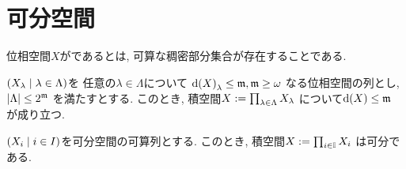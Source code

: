 \documentclass[uplatex, dvipdfmx, a4paper, 12pt, class=jsbook, crop=false]{standalone}
\begin{document}
\section{可分空間}
\label{sec:separable-spaces}

\begin{definition}
	位相空間$ X $がであるとは,
	可算な稠密部分集合が存在することである.
\end{definition}

\begin{theorem}
	\label{sep00001}
	\( \setfamily{X_\lambda}{\lambda \in \Lambda} \)を
	任意の\( \lambda \in \Lambda \)について
	\( \topdensity{X}_\lambda \leq \mathfrak{m}, \mathfrak{m} \geq \omega \)
	なる位相空間の列とし,
	\( \left|\Lambda\right| \leq 2^{\mathfrak{m}} \)
	を満たすとする.
	このとき, 積空間\( X \mathrel{:=} \prod_{\lambda \in \Lambda} X_\lambda \)
	について\( \topdensity{X} \leq \mathfrak{m} \)
	が成り立つ.
\end{theorem}

\begin{corollary}
	\label{sep00002}
	\( \setfamily{X_i}{i \in I} \)を可分空間の可算列とする.
	このとき, 積空間\( X \mathrel{:=} \prod_{i \in \mathbb{I}} X_i \)
	は可分である.
\end{corollary}
\end{document}
